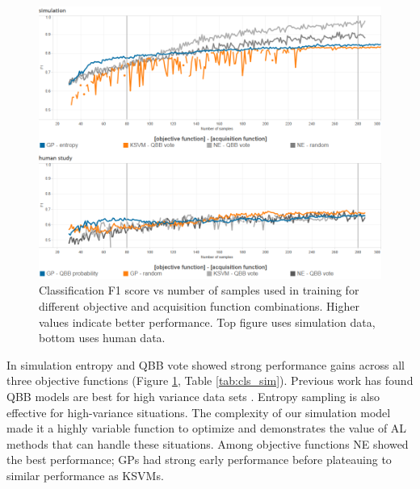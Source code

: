 \documentclass{sig-alternate}
\begin{document}
\begin{table}[tb]
\label{tab:cls_sim}
\end{table}

\begin{figure}[tbph]
\centering
\includegraphics[width=\linewidth]{classification_results}
\caption{Classification F1 score vs number of samples used in training for different objective and acquisition function combinations. Higher values indicate better performance. Top figure uses simulation data, bottom uses human data.}
\label{fig:cls_all}
\end{figure}


In simulation entropy and QBB vote showed strong performance gains across all three objective functions (Figure \ref{fig:cls_all}, Table \ref{tab:cls_sim}).
Previous work has found QBB models are best for high variance data sets \cite{schein2007:al-logreg-eval}.
Entropy sampling is also effective for high-variance situations.
The complexity of our simulation model made it a highly variable function to optimize and demonstrates the value of AL methods that can handle these situations.
Among objective functions NE showed the best performance; GPs had strong early performance before plateauing to similar performance as KSVMs.
\end{document}
